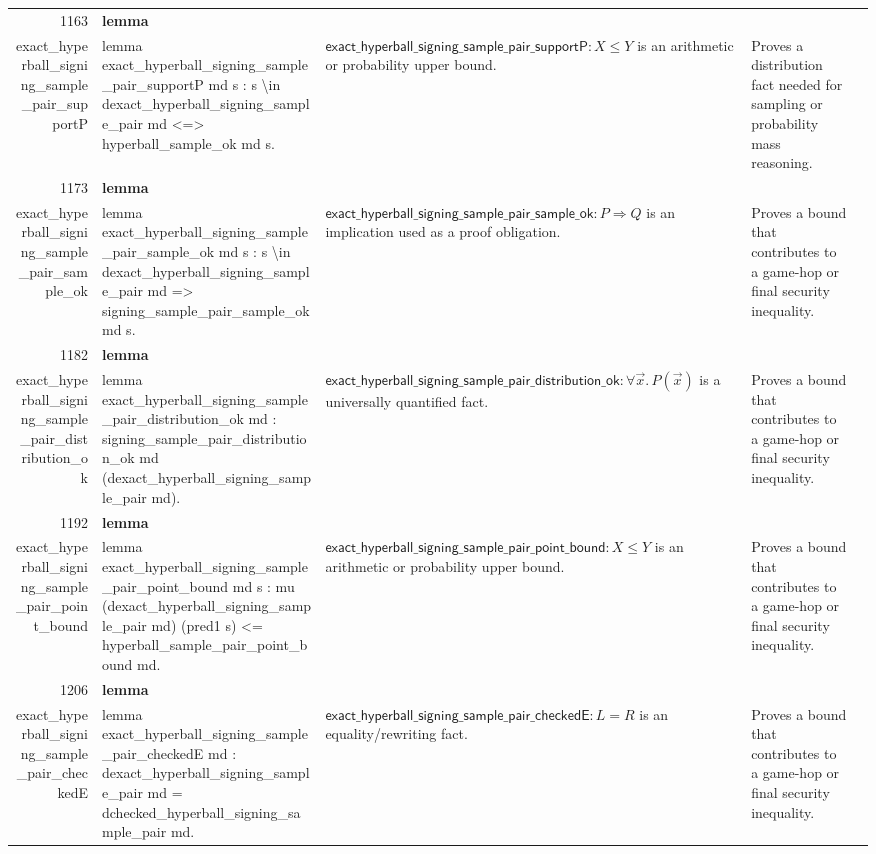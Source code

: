 \documentclass[10pt]{article}
\newcommand{\ec}[1]{\begingroup\ttfamily\scriptsize #1\endgroup}
\begin{document}
\begin{longtable}{r L{0.17\textwidth} L{0.26\textwidth} L{0.27\textwidth} L{0.20\textwidth}}
1163 & \textbf{lemma}\\\ec{exact\_hyperball\_signing\_sample\_pair\_supportP} & \ec{lemma exact\_hyperball\_signing\_sample\_pair\_supportP md s : s \textbackslash{}in dexact\_hyperball\_signing\_sample\_pair md <=> hyperball\_sample\_ok md s.} & \(\mathsf{exact\_hyperball\_signing\_sample\_pair\_supportP} : X \le Y\) is an arithmetic or probability upper bound. & Proves a distribution fact needed for sampling or probability mass reasoning. \\
1173 & \textbf{lemma}\\\ec{exact\_hyperball\_signing\_sample\_pair\_sample\_ok} & \ec{lemma exact\_hyperball\_signing\_sample\_pair\_sample\_ok md s : s \textbackslash{}in dexact\_hyperball\_signing\_sample\_pair md => signing\_sample\_pair\_sample\_ok md s.} & \(\mathsf{exact\_hyperball\_signing\_sample\_pair\_sample\_ok} : P \Rightarrow Q\) is an implication used as a proof obligation. & Proves a bound that contributes to a game-hop or final security inequality. \\
1182 & \textbf{lemma}\\\ec{exact\_hyperball\_signing\_sample\_pair\_distribution\_ok} & \ec{lemma exact\_hyperball\_signing\_sample\_pair\_distribution\_ok md : signing\_sample\_pair\_distribution\_ok md (dexact\_hyperball\_signing\_sample\_pair md).} & \(\mathsf{exact\_hyperball\_signing\_sample\_pair\_distribution\_ok} : \forall \vec{x}.\, P(\vec{x})\) is a universally quantified fact. & Proves a bound that contributes to a game-hop or final security inequality. \\
1192 & \textbf{lemma}\\\ec{exact\_hyperball\_signing\_sample\_pair\_point\_bound} & \ec{lemma exact\_hyperball\_signing\_sample\_pair\_point\_bound md s : mu (dexact\_hyperball\_signing\_sample\_pair md) (pred1 s) <= hyperball\_sample\_pair\_point\_bound md.} & \(\mathsf{exact\_hyperball\_signing\_sample\_pair\_point\_bound} : X \le Y\) is an arithmetic or probability upper bound. & Proves a bound that contributes to a game-hop or final security inequality. \\
1206 & \textbf{lemma}\\\ec{exact\_hyperball\_signing\_sample\_pair\_checkedE} & \ec{lemma exact\_hyperball\_signing\_sample\_pair\_checkedE md : dexact\_hyperball\_signing\_sample\_pair md = dchecked\_hyperball\_signing\_sample\_pair md.} & \(\mathsf{exact\_hyperball\_signing\_sample\_pair\_checkedE} : L = R\) is an equality/rewriting fact. & Proves a bound that contributes to a game-hop or final security inequality. \\
\bottomrule
\end{longtable}
\end{document}
